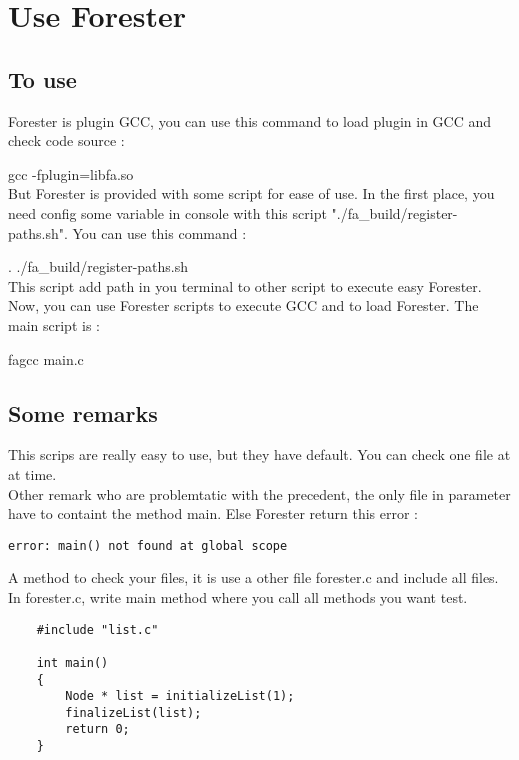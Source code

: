 \section {Use Forester}

	\subsection{To use}

Forester is plugin GCC, you can use this command to load plugin in GCC and check code source :

gcc -fplugin=libfa.so
\\

But Forester is provided with some script for ease of use. In the first place, you need config some variable in console with this script "./fa\_build/register-paths.sh". You can use this command :

. ./fa\_build/register-paths.sh
\\

This script add path in you terminal to other script to execute easy Forester. Now, you can use Forester scripts to execute GCC and to load Forester. The main script is :

fagcc main.c
\\

	\subsection{Some remarks}
	
This scrips are really easy to use, but they have default. You can check one file at at time.
\\

Other remark who are problemtatic with the precedent, the only file in parameter have to containt the method main. Else Forester return this error :

\lstset{language=C, numbers=left, frame=shadowbox}
\begin{lstlisting}
error: main() not found at global scope
\end{lstlisting}
\bigskip

A method to check your files, it is use a other file forester.c and include all files. In forester.c, write main method where you call all methods you want test.

\lstset{language=C, numbers=left, frame=shadowbox}
\begin{lstlisting}
	#include "list.c"

	int main()
	{
		Node * list = initializeList(1);
		finalizeList(list);
		return 0;
	}
\end{lstlisting}
\bigskip